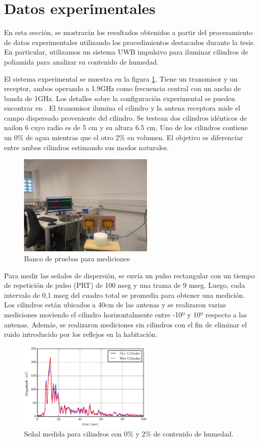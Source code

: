 \section{Datos experimentales}

	En esta sección, se mostrarán los resultados obtenidos a partir del procesamiento de datos experimentales utilizando los  procedimientos destacados durante la tesis. En particular, utilizamos un sistema UWB impulsivo para iluminar cilindros de poliamida para analizar su contenido de humedad.
	
	El sistema experimental se muestra en la figura \ref{Fig:testbed}. Tiene un transmisor y un receptor, ambos operando a 1.9GHz como frecuencia central con un ancho de banda de 1GHz. Los detalles sobre la configuración experimental se pueden encontrar en \cite{Altieri2020}. El transmisor ilumina el cilindro y la antena receptora mide el campo dispersado proveniente del cilindro. Se testean dos cilindros idénticos de nailon 6 cuyo radio es de 5 cm y su altura 6.5 cm. Uno de los cilindros contiene un 0\%  de agua mientras que el otro 2\% en volumen. El objetivo es diferenciar entre ambos cilindros estimando sus modos naturales.
	
	\begin{figure}[ht]
		\centerline{\includegraphics[width=6.5cm]{Figuras/testbed.jpg}}
		\caption{Banco de pruebas para mediciones}
		\label{Fig:testbed}
	\end{figure}
	
	Para medir las señales de dispersión, se envía un pulso rectangular con un tiempo de repetición de pulso (PRT) de 100 nseg y una trama de 9 mseg. Luego, cada intervalo de 0,1 mseg del cuadro total se promedia para obtener una medición. Los cilindros están ubicados a 40cm de las antenas y se realizaron varias mediciones moviendo el cilindro horizontalmente entre -10º y 10º respecto a las antenas. Además, se realizaron mediciones sin cilindros con el fin de eliminar el ruido introducido por los reflejos en la habitación.
	
	\begin{figure}[ht]
		\centerline{\includegraphics[width=6.5cm]{Figuras/senales}}
		\caption{Señal medida  para cilindros con 0\% y 2\% de contenido de humedad.}
		\label{Fig:backscattered}
	\end{figure}
	

